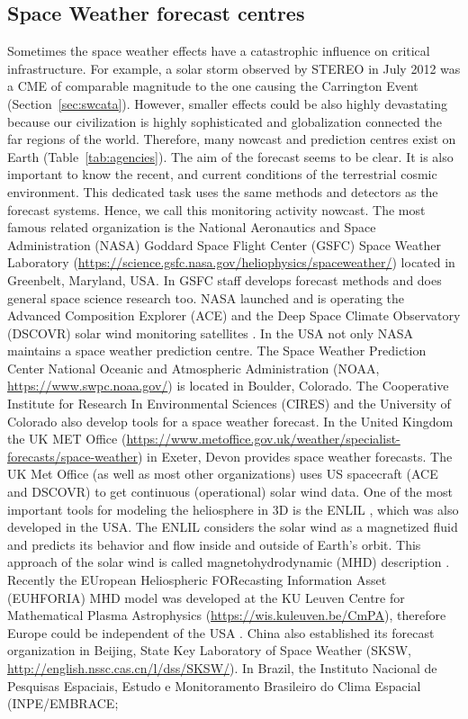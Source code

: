 \documentclass[sn-aps]{sn-jnl}%
\begin{document}
\subsection{Space Weather forecast centres}
\label{sec:swpred}

Sometimes the space weather effects have a catastrophic influence on critical infrastructure. For example, a solar storm observed by STEREO in July 2012 was a CME of comparable magnitude to the one causing the Carrington Event (Section~\ref{sec:swcata}). However, smaller effects could be also highly devastating because our civilization is highly sophisticated and globalization connected the far regions of the world. Therefore, many nowcast and prediction centres exist on Earth (Table~\ref{tab:agencies}). The aim of the forecast seems to be clear. It is also important to know the recent, and current conditions of the terrestrial cosmic environment. This dedicated task uses the same methods and detectors as the forecast systems. Hence, we call this monitoring activity nowcast. The most famous related organization is the National Aeronautics and Space Administration (NASA) Goddard Space Flight Center (GSFC) Space Weather Laboratory (\url{https://science.gsfc.nasa.gov/heliophysics/spaceweather/}) located in Greenbelt, Maryland, USA. In GSFC staff develops forecast methods and does general space science research too. NASA launched and is operating the Advanced Composition Explorer (ACE) and the Deep Space Climate Observatory (DSCOVR) solar wind monitoring satellites \cite{stone98:_advan_compos_explor,lotoaniu22:_valid_dscov_spacec_mission_space}. In the USA not only NASA maintains a space weather prediction centre. The Space Weather Prediction Center National Oceanic and Atmospheric Administration (NOAA, \url{https://www.swpc.noaa.gov/}) is located in Boulder, Colorado. The Cooperative Institute for Research In Environmental Sciences (CIRES) and the University of Colorado also develop tools for a space weather forecast. In the United Kingdom the UK MET Office (\url{https://www.metoffice.gov.uk/weather/specialist-forecasts/space-weather}) in Exeter, Devon provides space weather forecasts. The UK Met Office (as well as most other organizations) uses US spacecraft (ACE and DSCOVR) to get continuous (operational) solar wind data. One of the most important tools for modeling the heliosphere in 3D is the ENLIL \cite{odstrcil03:_model_d}, which was also developed in the USA. The ENLIL considers the solar wind as a magnetized fluid and predicts its behavior and flow inside and outside of Earth's orbit. This approach of the solar wind is called magnetohydrodynamic (MHD) description \cite{baumjohann96:_basic}. Recently the EUropean Heliospheric FORecasting Information Asset (EUHFORIA) MHD model was developed at the KU Leuven Centre for Mathematical Plasma Astrophysics (\url{https://wis.kuleuven.be/CmPA}), therefore Europe could be independent of the USA \cite{pomoell18:_euhfor}. China also established its forecast organization in Beijing, State Key Laboratory of Space Weather  (SKSW, \url{http://english.nssc.cas.cn/l/dss/SKSW/}). In Brazil, the Instituto Nacional de Pesquisas Espaciais, Estudo e Monitoramento Brasileiro do Clima Espacial (INPE/EMBRACE; 
\end{document}
